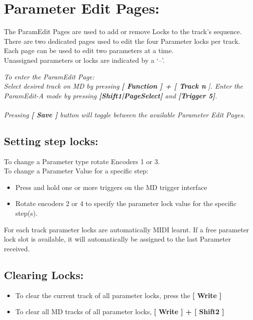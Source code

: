 \chapter{Parameter Edit Pages:}
The ParamEdit Pages are used to add or remove Locks to the track’s sequence.
\\

There are two dedicated pages used to edit the four Parameter locks per track.\\
Each page can be used to edit two parameters at a time.
\\

Unassigned parameters or locks are indicated by a ‘--’.


\textit{To enter the ParamEdit Page:\\ Select desired track on MD by pressing \textbf{[ Function ] + [ Track n }]. Enter the ParamEdit-A mode by pressing \textbf{[Shift1|PageSelect]} and \textbf{[Trigger 5]}.}
\\\\
\textit{Pressing \textbf{[ Save ]} button will toggle between the available Parameter Edit Pages.}


\section{Setting step locks:}
To change a Parameter type rotate Encoders 1 or 3.\\
To change a Parameter Value for a specific step:
\begin{itemize}
\item Press and hold one or more triggers on the MD trigger interface
\item Rotate encoders 2 or 4 to specify the parameter lock value for the specific step(s).
\end{itemize}
For each track parameter locks are automatically MIDI learnt. If a free parameter lock slot is available, it will automatically be assigned to the last Parameter received. 
\section{Clearing Locks:}
\begin{itemize}
\item To clear the current track of all parameter locks, press the \textbf{[ Write  ]}
\item To clear all MD tracks of all parameter locks, \textbf{[ Write ] + [ Shift2 ]}
\end{itemize}